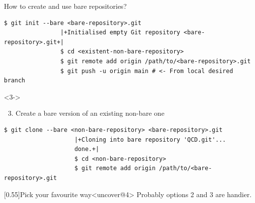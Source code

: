 \documentclass[usenames,svgnames,14pt]{beamer}
\begin{document}
\begin{frame}[fragile]{How to create and use bare repositories?}
\begin{overlayarea}{\textwidth}{0.8\textheight}
\begin{onlyenv}
\begin{lstlisting}[style=MyBash]
                $ git init --bare <bare-repository>.git
                |+Initialised empty Git repository <bare-repository>.git+|
                $ cd <existent-non-bare-repository>
                $ git remote add origin /path/to/<bare-repository>.git
                $ git push -u origin main # <- From local desired branch
            \end{lstlisting}
            \vspace{1mm}
            \begin{uncoverenv}<3->
                \begin{enumerate}
                    \setcounter{enumi}{2}
                    \item Create a bare version of an existing non-bare one
                \end{enumerate}
                \begin{lstlisting}[style=MyBash]
                    $ git clone --bare <non-bare-repository> <bare-repository>.git
                    |+Cloning into bare repository 'QCD.git'...
                    done.+|
                    $ cd <non-bare-repository>
                    $ git remote add origin /path/to/<bare-repository>.git
                \end{lstlisting}
            \end{uncoverenv}
            \vspace{-1mm}
            \begin{varblock}{}[0.55\textwidth]{Pick your favourite way}<uncover@4>
                \small Probably options 2 and 3 are handier.
            \end{varblock}
        \end{onlyenv}
    \end{overlayarea}
\end{frame}


\end{document}
